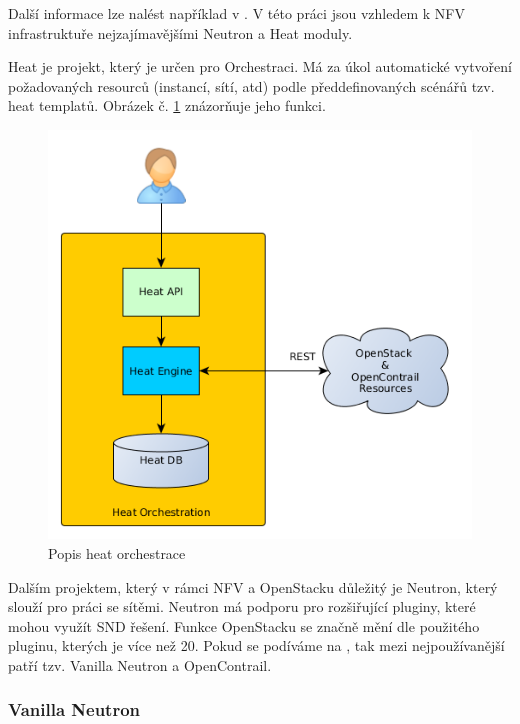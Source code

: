 Další informace lze nalést například v \cite{OpenStack}. V této práci jsou vzhledem k NFV infrastruktuře nejzajímavějšími Neutron a Heat moduly.

Heat je projekt, který je určen pro Orchestraci. Má za úkol automatické vytvoření požadovaných resourců (instancí, sítí, atd) podle předdefinovaných scénářů tzv. heat templatů. Obrázek č. \ref{fig:heat_engine} znázorňuje jeho funkci. \cite{HEAT}

\begin{figure}[h]
\begin{centering}
\includegraphics[scale=0.41]{images/heat_engine}
\par\end{centering}
\caption{Popis heat orchestrace\label{fig:heat_engine}}
\end{figure}

Dalším projektem, který v rámci NFV a OpenStacku důležitý je Neutron, který slouží pro práci se sítěmi. Neutron má podporu pro rozšiřující pluginy, které mohou využít SND řešení. Funkce OpenStacku se značně mění dle použitého pluginu, kterých je více než 20. Pokud se podíváme na \cite{neutron_survey} , tak mezi nejpoužívanější patří tzv. Vanilla Neutron a OpenContrail. 

\subsubsection{Vanilla Neutron}

